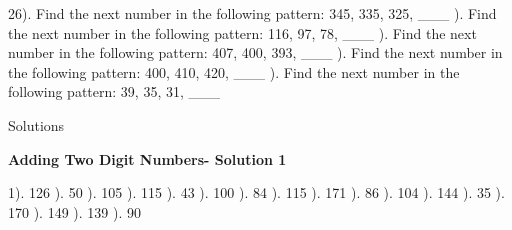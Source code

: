 \documentclass{article}%
\begin{document}
26). Find the next number in the following pattern: 345, 335, 325, \_\_\_%
\newline%
\newline%
). Find the next number in the following pattern: 116, 97, 78, \_\_\_%
\newline%
\newline%
). Find the next number in the following pattern: 407, 400, 393, \_\_\_%
\newline%
\newline%
). Find the next number in the following pattern: 400, 410, 420, \_\_\_%
\newline%
\newline%
). Find the next number in the following pattern: 39, 35, 31, \_\_\_%
\newline%
\newline%
\newline%
\pagebreak%
\huge%
\vspace*{\fill}%
\begin{center}%
Solutions%
\end{center}%
\vspace*{\fill}%
\normalsize%
\pagebreak%
\large%
\begin{center}%
\textbf{Adding Two Digit Numbers- Solution 1}%
\newline%
\end{center} \normalsize%
1). 126%
). 50%
). 105%
). 115%
). 43%
). 100%
). 84%
). 115%
). 171%
). 86%
). 104%
). 144%
). 35%
). 170%
). 149%
). 139%
). 90%
\newline%
\end{document}
